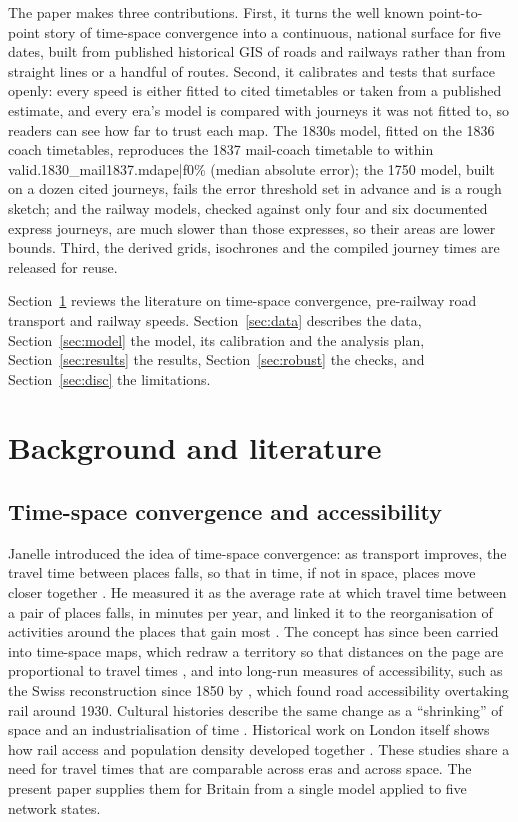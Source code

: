 The paper makes three contributions. First, it turns the well known point-to-point story of time-space convergence \citep{janelle1968,janelle1969} into a continuous, national surface for five dates, built from published historical GIS of roads and railways rather than from straight lines or a handful of routes. Second, it calibrates and tests that surface openly: every speed is either fitted to cited timetables or taken from a published estimate, and every era's model is compared with journeys it was not fitted to, so readers can see how far to trust each map. The 1830s model, fitted on the 1836 coach timetables, reproduces the 1837 mail-coach timetable to within {{valid.1830_mail1837.mdape|f0}}\% (median absolute error); the 1750 model, built on a dozen cited journeys, fails the error threshold set in advance and is a rough sketch; and the railway models, checked against only four and six documented express journeys, are much slower than those expresses, so their areas are lower bounds. Third, the derived grids, isochrones and the compiled journey times are released for reuse.

Section~\ref{sec:lit} reviews the literature on time-space convergence, pre-railway road transport and railway speeds. Section~\ref{sec:data} describes the data, Section~\ref{sec:model} the model, its calibration and the analysis plan, Section~\ref{sec:results} the results, Section~\ref{sec:robust} the checks, and Section~\ref{sec:disc} the limitations.

\section{Background and literature}\label{sec:lit}
\subsection{Time-space convergence and accessibility}
Janelle introduced the idea of time-space convergence: as transport improves, the travel time between places falls, so that in time, if not in space, places move closer together \citep{janelle1968}. He measured it as the average rate at which travel time between a pair of places falls, in minutes per year, and linked it to the reorganisation of activities around the places that gain most \citep{janelle1969}. The concept has since been carried into time-space maps, which redraw a territory so that distances on the page are proportional to travel times \citep{spiekermann1994}, and into long-run measures of accessibility, such as the Swiss reconstruction since 1850 by \citet{axhausen2011}, which found road accessibility overtaking rail around 1930. Cultural histories describe the same change as a ``shrinking'' of space and an industrialisation of time \citep{schivelbusch1986}. Historical work on London itself shows how rail access and population density developed together \citep{levinson2008}. These studies share a need for travel times that are comparable across eras and across space. The present paper supplies them for Britain from a single model applied to five network states.

